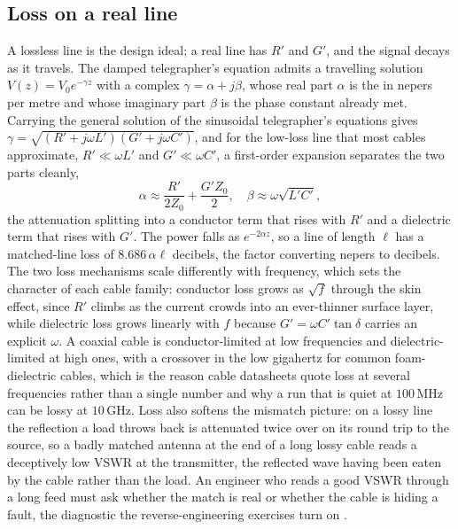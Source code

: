 \subsection{Loss on a real line}

A lossless line is the design ideal; a real line has $R'$ and $G'$, and
the signal decays as it travels. The damped telegrapher's equation admits
a travelling solution $V(z) = V_0 e^{-\gamma z}$ with a complex
 $\gamma = \alpha + j\beta$, whose real part
$\alpha$ is the  in nepers per metre and
whose imaginary part $\beta$ is the phase constant already met. Carrying
the general solution of the sinusoidal telegrapher's equations gives
$\gamma = \sqrt{(R' + j\omega L')(G' + j\omega C')}$, and for the
low-loss line that most cables approximate, $R'\ll \omega L'$ and $G'\ll
\omega C'$, a first-order expansion separates the two parts cleanly,
\[
\alpha \approx \frac{R'}{2 Z_0} + \frac{G' Z_0}{2}, \quad
\beta \approx \omega\sqrt{L' C'},
\]
the attenuation splitting into a conductor term that rises with $R'$ and a
dielectric term that rises with $G'$. The power falls as $e^{-2\alpha z}$,
so a line of length $\ell$ has a matched-line loss of $8.686\,\alpha\ell$
decibels, the factor converting nepers to decibels. The two loss
mechanisms scale differently with frequency, which sets the character of
each cable family: conductor loss grows as $\sqrt{f}$ through the skin
effect, since $R'$ climbs as the current crowds into an ever-thinner
surface layer, while dielectric loss grows linearly with $f$ because $G' =
\omega C'\tan\delta$ carries an explicit $\omega$. A coaxial cable is
conductor-limited at low frequencies and dielectric-limited at high ones,
with a crossover in the low gigahertz for common foam-dielectric cables,
which is the reason cable datasheets quote loss at several frequencies
rather than a single number and why a run that is quiet at $100\,\si{\mega
\hertz}$ can be lossy at $10\,\si{\giga\hertz}$. Loss also softens the
mismatch picture: on a lossy line the reflection a load throws back is
attenuated twice over on its round trip to the source, so a badly matched
antenna at the end of a long lossy cable reads a deceptively low VSWR at
the transmitter, the reflected wave having been eaten by the cable rather
than the load. An engineer who reads a good VSWR through a long feed must
ask whether the match is real or whether the cable is hiding a fault, the
diagnostic the reverse-engineering exercises turn on \cite{text:pozar-microwave}.

